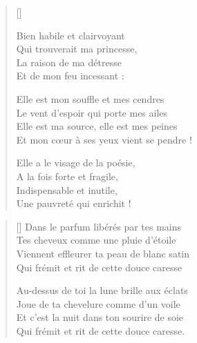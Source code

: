 \settowidth{\versewidth}{Et cette fièvre absente peut m'étouffer :}
\begin{verse}[\versewidth]

Bien habile et clairvoyant \\
Qui trouverait ma princesse, \\
La raison de ma détresse \\
Et de mon feu incessant :


Elle est mon souffle et mes cendres \\
Le vent d'espoir qui porte mes ailes \\
Elle est ma source, elle est mes peines \\
Et mon cœur à ses yeux vient se pendre !

Elle a le visage de la poésie, \\
A la fois forte et fragile, \\
Indispensable et inutile, \\
Une pauvreté qui enrichit !

\end{verse}

\newpage

\settowidth{\versewidth}{Au-dessus de toi la lune brille aux éclats}
\begin{verse}[\versewidth]
Dans le parfum libérés par tes mains \\
Tes cheveux comme une pluie d'étoile \\
Viennent effleurer ta peau de blanc satin \\
Qui frémit et rit de cette douce caresse

Au-dessus de toi la lune brille aux éclats \\
Joue de ta chevelure comme d'un voile \\
Et c'est la nuit dans ton sourire de soie \\
Qui frémit et rit de cette douce caresse.
\end{verse}

